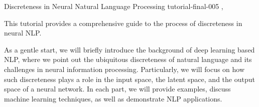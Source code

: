 \begin{tutorial}
  {Discreteness in Neural Natural Language Processing}
  {tutorial-final-005}
  {\daydateyear, \tutorialmorningtime}
  {\TutLocE}

This tutorial provides a comprehensive guide to the process of discreteness in neural NLP.

As a gentle start, we will briefly introduce the background of deep learning based NLP, where we point out the ubiquitous discreteness of natural language and its challenges in neural information processing. Particularly, we will focus on how such discreteness plays a role in the input space, the latent space, and the output space of a neural network. In each part, we will provide examples, discuss machine learning techniques, as well as demonstrate NLP applications.

\end{tutorial}
